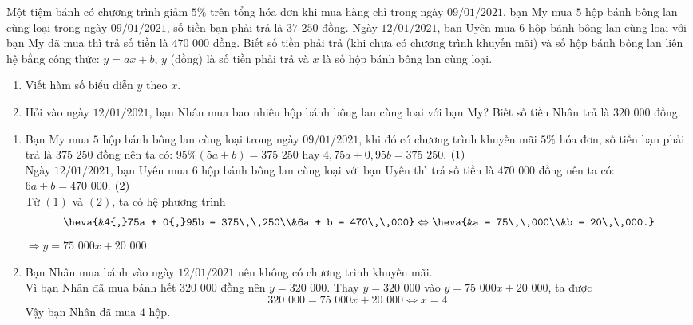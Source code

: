 \begin{bt}%
	Một tiệm bánh có chương trình giảm $5\%$ trên tổng hóa đơn khi mua hàng chỉ trong ngày $09/01/2021$, bạn My mua $5$ hộp bánh bông lan cùng loại trong ngày $09/01/2021$, số tiền bạn phải trả là $37\,\, 250$ đồng. Ngày $12/01/2021$, bạn Uyên mua $6$ hộp bánh bông lan cùng loại với bạn My đã mua thì trả số tiền là $470\,\,000$ đồng. Biết số tiền phải trả (khi chưa có chương trình khuyến mãi) và số hộp bánh bông lan liên hệ bằng công thức: $y = ax + b$, $y$ (đồng) là số tiền phải trả và $x$ là số hộp bánh bông lan cùng loại.
	\begin{enumerate}
		\item Viết hàm số biểu diễn $y$ theo $x$.
		\item Hỏi vào ngày $12/01/2021$, bạn Nhân mua bao nhiêu hộp bánh bông lan cùng loại với bạn My? Biết số tiền Nhân trả là $320\,\,000$ đồng.
	\end{enumerate}
	\loigiai
	{
		\begin{enumerate}
			\item Bạn My mua $5$ hộp bánh bông lan cùng loại trong ngày $09/01/2021$, khi đó có chương trình khuyến mãi $5\%$ hóa đơn, số tiền bạn phải trả là $375\,\,250$ đồng nên ta có: $95\%(5a + b) = 375\,\,250$ hay $4{,}75a + 0{,}95b = 375\,\,250$. $\hfill (1)$\\
			      Ngày $12/01/2021$, bạn Uyên mua $6$ hộp bánh bông lan cùng loại với bạn Uyên thì trả số tiền là $470\,\,000$ đồng nên ta có: $6a + b = 470\,\,000$. $\hfill (2)$\\
			      Từ $(1)$ và $(2)$, ta có hệ phương trình
			      $$ \heva{&4{,}75a + 0{,}95b = 375\,\,250\\&6a + b = 470\,\,000} \Leftrightarrow \heva{&a = 75\,\,000\\&b = 20\,\,000.} $$
			      $\Rightarrow y = 75\,\,000x + 20\,\,000$.
			\item Bạn Nhân mua bánh vào ngày $12/01/2021$ nên không có chương trình khuyến mãi.\\
			      Vì bạn Nhân đã mua bánh hết $320\,\,000$ đồng nên $y = 320\,\,000$. Thay $y = 320\,\,000$ vào $y = 75\,\,000x + 20\,\,000$, ta được
			      $$ 320\,\,000 = 75\,\,000x + 20\,\,000 \Leftrightarrow x = 4. $$
			      Vậy bạn Nhân đã mua $4$ hộp.
		\end{enumerate}
	}
\end{bt}

